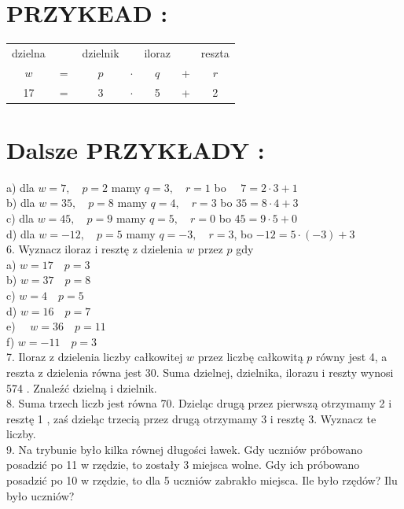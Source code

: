 \documentclass[10pt]{article}
\begin{document}
\section*{PRZYKEAD :}
\begin{center}
\begin{tabular}{ccccccc}
dzielna &  & dzielnik &  & iloraz &  & reszta \\
\(w\) & \(=\) & \(p\) & \(\cdot\) & \(q\) & + & \(r\) \\
17 & \(=\) & 3 & \(\cdot\) & 5 & + & 2 \\
\end{tabular}
\end{center}

\section*{Dalsze PRZYKŁADY :}
a) dla \(w=7, \quad p=2\) mamy \(q=3, \quad r=1\) bo \(\quad 7=2 \cdot 3+1\)\\
b) dla \(w=35, \quad p=8\) mamy \(q=4, \quad r=3\) bo \(35=8 \cdot 4+3\)\\
c) dla \(w=45, \quad p=9\) mamy \(q=5, \quad r=0\) bo \(45=9 \cdot 5+0\)\\
d) dla \(w=-12, \quad p=5\) mamy \(q=-3, \quad r=3\), bo \(-12=5 \cdot(-3)+3\)\\
6. Wyznacz iloraz i resztę z dzielenia \(w\) przez \(p\) gdy\\
a) \(w=17 \quad p=3\)\\
b) \(w=37 \quad p=8\)\\
c) \(w=4 \quad p=5\)\\
d) \(w=16 \quad p=7\)\\
e) \(\quad w=36 \quad p=11\)\\
f) \(w=-11 \quad p=3\)\\
7. Iloraz z dzielenia liczby całkowitej \(w\) przez liczbę całkowitą \(p\) równy jest 4, a reszta z dzielenia równa jest 30. Suma dzielnej, dzielnika, ilorazu i reszty wynosi 574 . Znaleźć dzielną i dzielnik.\\
8. Suma trzech liczb jest równa 70. Dzieląc drugą przez pierwszą otrzymamy 2 i resztę 1 , zaś dzieląc trzecią przez drugą otrzymamy 3 i resztę 3. Wyznacz te liczby.\\
9. Na trybunie było kilka równej długości ławek. Gdy uczniów próbowano posadzić po 11 w rzędzie, to zostały 3 miejsca wolne. Gdy ich próbowano posadzić po 10 w rzędzie, to dla 5 uczniów zabrakło miejsca. Ile było rzędów? Ilu było uczniów?
\end{document}
